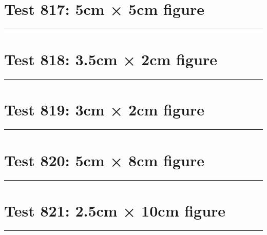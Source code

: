 \documentclass[a4paper,11pt]{article}
\begin{document}
\section*{Test 817: 5cm × 5cm figure}
\begin{swarmwrap}%
  \begin{minipage}[t]{5cm}
    \centering
    \rule{\linewidth}{5cm}
  \end{minipage}%
\end{swarmwrap}%
\swarmwrapnext
\lipsum[3]
\lipsum[4]
\lipsum[5]
\lipsum[6]
\section*{Test 818: 3.5cm × 2cm figure}
\begin{swarmwrap}%
  \begin{minipage}[t]{3cm}
    \centering
    \rule{\linewidth}{2cm}
  \end{minipage}%
\end{swarmwrap}%
\swarmwrapnext
\lipsum[140]
\lipsum[141]
\lipsum[142]
\lipsum[143]
\section*{Test 819: 3cm × 2cm figure}
\begin{swarmwrap}%
  \begin{minipage}[t]{3cm}
    \centering
    \rule{\linewidth}{2cm}
  \end{minipage}%
\end{swarmwrap}%
\swarmwrapnext
\lipsum[2]
\lipsum[3]
\lipsum[4]
\lipsum[5]
\lipsum[6]
\section*{Test 820: 5cm × 8cm figure}
\begin{swarmwrap}%
  \begin{minipage}[t]{5cm}
    \centering
    \rule{\linewidth}{8cm}
  \end{minipage}%
\end{swarmwrap}%
\swarmwrapnext
\lipsum[28]
\lipsum[29]
\lipsum[30]
\lipsum[31]
\lipsum[32]
\section*{Test 821: 2.5cm × 10cm figure}
\begin{swarmwrap}%
  \begin{minipage}[t]{2cm}
    \centering
    \rule{\linewidth}{10cm}
  \end{minipage}%
\end{swarmwrap}%
\swarmwrapnext
\lipsum[109]
\lipsum[110]
\lipsum[111]
\lipsum[112]
\end{document}
